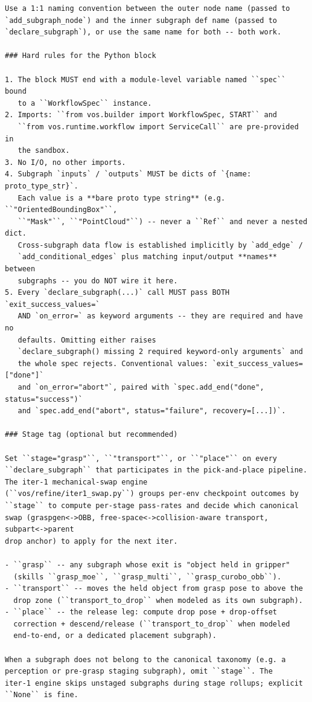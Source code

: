 \begin{lstlisting}
Use a 1:1 naming convention between the outer node name (passed to
`add_subgraph_node`) and the inner subgraph def name (passed to
`declare_subgraph`), or use the same name for both -- both work.

### Hard rules for the Python block

1. The block MUST end with a module-level variable named ``spec`` bound
   to a ``WorkflowSpec`` instance.
2. Imports: ``from vos.builder import WorkflowSpec, START`` and
   ``from vos.runtime.workflow import ServiceCall`` are pre-provided in
   the sandbox.
3. No I/O, no other imports.
4. Subgraph `inputs` / `outputs` MUST be dicts of `{name: proto_type_str}`.
   Each value is a **bare proto type string** (e.g. ``"OrientedBoundingBox"``,
   ``"Mask"``, ``"PointCloud"``) -- never a ``Ref`` and never a nested dict.
   Cross-subgraph data flow is established implicitly by `add_edge` /
   `add_conditional_edges` plus matching input/output **names** between
   subgraphs -- you do NOT wire it here.
5. Every `declare_subgraph(...)` call MUST pass BOTH `exit_success_values=`
   AND `on_error=` as keyword arguments -- they are required and have no
   defaults. Omitting either raises
   `declare_subgraph() missing 2 required keyword-only arguments` and
   the whole spec rejects. Conventional values: `exit_success_values=["done"]`
   and `on_error="abort"`, paired with `spec.add_end("done", status="success")`
   and `spec.add_end("abort", status="failure", recovery=[...])`.

### Stage tag (optional but recommended)

Set ``stage="grasp"``, ``"transport"``, or ``"place"`` on every
``declare_subgraph`` that participates in the pick-and-place pipeline.
The iter-1 mechanical-swap engine
(``vos/refine/iter1_swap.py``) groups per-env checkpoint outcomes by
``stage`` to compute per-stage pass-rates and decide which canonical
swap (graspgen<->OBB, free-space<->collision-aware transport, subpart<->parent
drop anchor) to apply for the next iter.

- ``grasp`` -- any subgraph whose exit is "object held in gripper"
  (skills ``grasp_moe``, ``grasp_multi``, ``grasp_curobo_obb``).
- ``transport`` -- moves the held object from grasp pose to above the
  drop zone (``transport_to_drop`` when modeled as its own subgraph).
- ``place`` -- the release leg: compute drop pose + drop-offset
  correction + descend/release (``transport_to_drop`` when modeled
  end-to-end, or a dedicated placement subgraph).

When a subgraph does not belong to the canonical taxonomy (e.g. a
perception or pre-grasp staging subgraph), omit ``stage``. The
iter-1 engine skips unstaged subgraphs during stage rollups; explicit
``None`` is fine.


\end{lstlisting}
